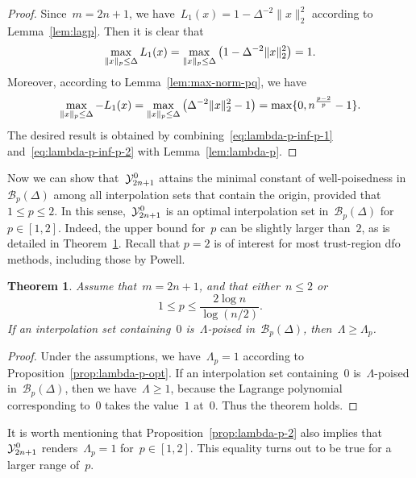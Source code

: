 \documentclass{article}
\numberwithin{equation}{section}
\theoremstyle{definition}
\theoremstyle{plain}
\newtheorem{theorem}{Theorem}[section]
\theoremstyle{remark}
\newcommand*{\lagp}[1][]{L\ifblank{#1}{}{_{#1}}}
\newcommand*{\norm}[2][]{#1\lVert#2#1\rVert}
\newcommand*{\xpt}[1][]{\mathcal{Y}\ifblank{#1}{}{^{#1}}}
\begin{document}
\begin{proof}
    Since~$m = 2n+1$, we have~$L_1(x) = 1- \Delta^{-2}\norm{x}_2^2$ according to Lemma~\ref{lem:lagp}.
    Then it is clear that
    \begin{equation}
        \label{eq:lambda-p-inf-p-1}
        \max_{\norm{x}_p \le \Delta} \lagp[1](x) = \max_{\norm{x}_p \le \Delta} \big( 1 - \Delta^{-2}{\norm{x}_2^2} \big) = 1.
    \end{equation}
    Moreover, according to Lemma~\ref{lem:max-norm-pq}, we have
    \begin{equation}
        \label{eq:lambda-p-inf-p-2}
        \max_{\norm{x}_p \le \Delta} -\lagp[1](x) = \max_{\norm{x}_p \le \Delta} \big( \Delta^{-2}
        {\norm{x}_2^2} - 1 \big) = \max\{0, n^{\frac{p - 2}{p}} - 1\}.
    \end{equation}
    The desired result is obtained by combining~\eqref{eq:lambda-p-inf-p-1} and~\eqref{eq:lambda-p-inf-p-2} with Lemma~\ref{lem:lambda-p}.
\end{proof}

Now we can show that~$\xpt[0]_{2n+1}$ attains the minimal constant of well-poisedness in~$\mathcal{B}_p(\Delta)$ among all interpolation sets that contain the origin, provided that~$1 \le p\le 2$.
In this sense,~$\xpt[0]_{2n + 1}$ is an optimal interpolation set in~$\mathcal{B}_p(\Delta)$ for~$p \in [1, 2]$.
Indeed, the upper bound for~$p$ can be slightly larger than~$2$, as is detailed in Theorem~\ref{thm:optimset}.
Recall that $p=2$ is of interest for most trust-region \gls{dfo} methods, including those by Powell.
\begin{theorem}
    \label{thm:optimset}
    Assume that~$m=2n+1$, and that either~$n\le 2$ or
    \begin{equation}
        \label{eq:pineq}
        1 \le p \le \frac{2\log n}{\log (n/2)}.
    \end{equation}
    If an interpolation set containing~$0$ is~$\Lambda$-poised in~$\mathcal{B}_p(\Delta)$, then~$\Lambda \ge \Lambda_p$.
\end{theorem}

\begin{proof}
    Under the assumptions, we have~$\Lambda_p = 1$ according to Proposition~\ref{prop:lambda-p-opt}.
    If an interpolation set containing~$0$ is~$\Lambda$-poised in~$\mathcal{B}_p(\Delta)$, then we
    have~$\Lambda \ge 1$, because the Lagrange polynomial corresponding to~$0$ takes the value~$1$ at~$0$.
    Thus the theorem holds.
\end{proof}
It is worth mentioning that Proposition~\ref{prop:lambda-p-2} also implies that~$\xpt[0]_{2n+1}$ renders~$\Lambda_p = 1$ for~$p \in [1, 2]$.
This equality turns out to be true for a larger range of~$p$.
\end{document}
